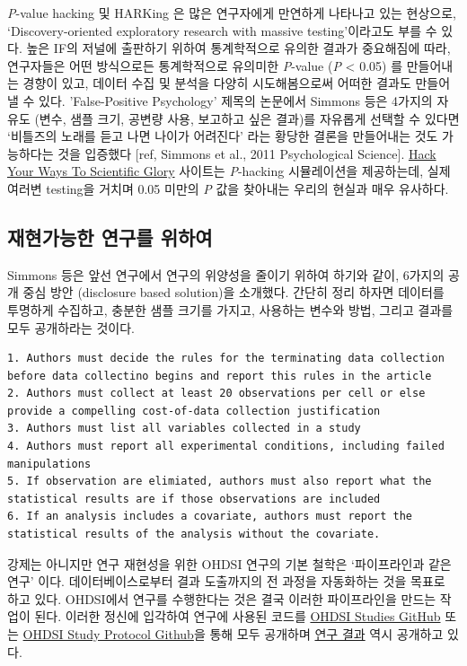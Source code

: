 \documentclass[]{book}
\begin{document}
\emph{P}-value hacking 및 HARKing 은 많은 연구자에게 만연하게 나타나고 있는 현상으로, `Discovery-oriented exploratory research with massive testing'이라고도 부를 수 있다. 높은 IF의 저널에 출판하기 위하여 통계학적으로 유의한 결과가 중요해짐에 따라, 연구자들은 어떤 방식으로든 통계학적으로 유의미한 \emph{P}-value (\emph{P} \textless{} 0.05) 를 만들어내는 경향이 있고, 데이터 수집 및 분석을 다양히 시도해봄으로써 어떠한 결과도 만들어 낼 수 있다. 'False-Positive Psychology' 제목의 논문에서 Simmons 등은 4가지의 자유도 (변수, 샘플 크기, 공변량 사용, 보고하고 싶은 결과)를 자유롭게 선택할 수 있다면 `비틀즈의 노래를 듣고 나면 나이가 어려진다' 라는 황당한 결론을 만들어내는 것도 가능하다는 것을 입증했다 {[}ref, Simmons et al., 2011 Psychological Science{]}. \href{https://projects.fivethirtyeight.com/p-hacking/}{Hack Your Ways To Scientific Glory} 사이트는 \emph{P}-hacking 시뮬레이션을 제공하는데, 실제 여러변 testing을 거치며 0.05 미만의 \emph{P} 값을 찾아내는 우리의 현실과 매우 유사하다.

\hypertarget{section}{%
\subsection{재현가능한 연구를 위하여}\label{section}}

Simmons 등은 앞선 연구에서 연구의 위양성을 줄이기 위하여 하기와 같이, 6가지의 공개 중심 방안 (disclosure based solution)을 소개했다. 간단히 정리 하자면 데이터를 투명하게 수집하고, 충분한 샘플 크기를 가지고, 사용하는 변수와 방법, 그리고 결과를 모두 공개하라는 것이다.

\begin{verbatim}
1. Authors must decide the rules for the terminating data collection before data collectino begins and report this rules in the article
2. Authors must collect at least 20 observations per cell or else provide a compelling cost-of-data collection justification
3. Authors must list all variables collected in a study
4. Authors must report all experimental conditions, including failed manipulations
5. If observation are elimiated, authors must also report what the statistical results are if those observations are included
6. If an analysis includes a covariate, authors must report the statistical results of the analysis without the covariate. 
\end{verbatim}

강제는 아니지만 연구 재현성을 위한 OHDSI 연구의 기본 철학은 `파이프라인과 같은 연구' 이다. 데이터베이스로부터 결과 도출까지의 전 과정을 자동화하는 것을 목표로 하고 있다. OHDSI에서 연구를 수행한다는 것은 결국 이러한 파이프라인을 만드는 작업이 된다. 이러한 정신에 입각하여 연구에 사용된 코드를 \href{https://github.com/OHDSI/OhdsiStudies}{OHDSI Studies GitHub} 또는 \href{https://github.com/OHDSI/StudyProtocols}{OHDSI Study Protocol Github}을 통해 모두 공개하며 \href{http://data.ohdsi.org/}{연구 결과} 역시 공개하고 있다.
\end{document}
